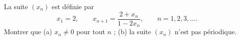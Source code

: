 La suite $(x_n)$ est définie par
\[ x_1 = 2,\qquad x_{n+1} = \frac{2 + x_n}{1 - 2x_n},\qquad n = 1, 2, 3, \ldots. \]
Montrer que (a) $x_n \neq 0$ pour tout $n$ ; (b) la suite $(x_n)$ n'est pas périodique.
